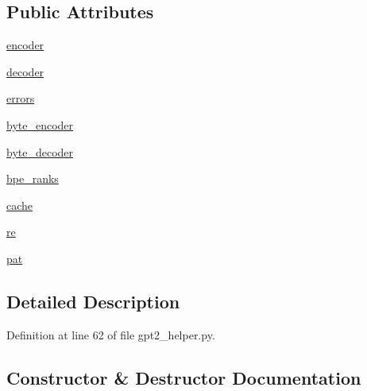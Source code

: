 \subsection*{Public Attributes}
\begin{DoxyCompactItemize}
\item 
\hyperlink{classparlai_1_1core_1_1gpt2__helper_1_1Gpt2BpeHelper_a794ff2b9372acac9ab7c80b5c07ab60b}{encoder}
\item 
\hyperlink{classparlai_1_1core_1_1gpt2__helper_1_1Gpt2BpeHelper_a26ab20eb1b181e46035f2164513d8fce}{decoder}
\item 
\hyperlink{classparlai_1_1core_1_1gpt2__helper_1_1Gpt2BpeHelper_a0ea9f7588f25a62eb6021a54ea8ca095}{errors}
\item 
\hyperlink{classparlai_1_1core_1_1gpt2__helper_1_1Gpt2BpeHelper_aa05888129c3d12eec57bc03e92390e4c}{byte\+\_\+encoder}
\item 
\hyperlink{classparlai_1_1core_1_1gpt2__helper_1_1Gpt2BpeHelper_aaa6f9b57563422f3651ee240013ae9f4}{byte\+\_\+decoder}
\item 
\hyperlink{classparlai_1_1core_1_1gpt2__helper_1_1Gpt2BpeHelper_a3138a0a7614de78ee773642fbe6ddaae}{bpe\+\_\+ranks}
\item 
\hyperlink{classparlai_1_1core_1_1gpt2__helper_1_1Gpt2BpeHelper_a9362e804fcdf0565a640996285e85689}{cache}
\item 
\hyperlink{classparlai_1_1core_1_1gpt2__helper_1_1Gpt2BpeHelper_ac1ad446c51c26831655244d83350589a}{re}
\item 
\hyperlink{classparlai_1_1core_1_1gpt2__helper_1_1Gpt2BpeHelper_afbdbf5259b69f21f389eecaaada838d8}{pat}
\end{DoxyCompactItemize}


\subsection{Detailed Description}


Definition at line 62 of file gpt2\+\_\+helper.\+py.



\subsection{Constructor \& Destructor Documentation}
\mbox{\label{classparlai_1_1core_1_1gpt2__helper_1_1Gpt2BpeHelper_a5c9324bab66b00f6f977aef0241927bd}} 
